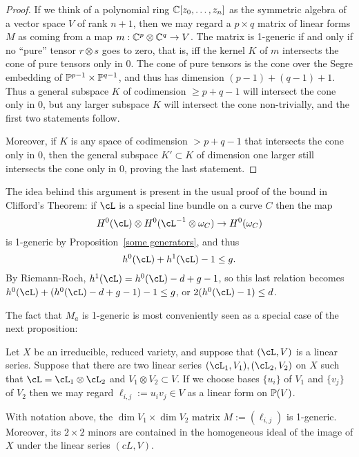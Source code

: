 \begin{proof}
If we think of a polynomial ring $\CC[z_0,\dots,z_n]$ as the symmetric algebra
of a vector space $V$ of rank $n+1$, then we may regard a $p\times q$ matrix of
linear forms $M$ as coming from a map $m: \CC^{p}\otimes \CC^{q}\to V$. The matrix is 1-generic
if and only if no ``pure'' tensor $r\otimes s$ goes to zero, that is, iff the kernel $K$ of $m$ intersects the cone of
pure tensors only in 0. The cone of pure tensors is the cone over the Segre embedding of $\PP^{p-1}\times \PP^{q-1}$, 
and thus has dimension $(p-1)+(q-1)+1$. Thus a general subspace $K$ of codimension $\geq p+q-1$ will intersect the cone
only in 0, but any larger subspace $K$ will intersect the cone non-trivially,  and the first two statements follow.

Moreover, if $K$ is any space of codimension $>p+q-1$ that intersects the cone only in 0, then the general subspace $K'\subset K$
of dimension one larger still intersects the cone only in 0, proving the last statement.
\end{proof}

The idea behind this argument is present in the usual proof of the bound in Clifford's Theorem: if $\cL$ is a special
line bundle on a curve $C$ then the map 
$$
\HH^0(\cL) \otimes \HH^0(\cL^{-1}\otimes \omega_C) \to \HH^0 (\omega_C)
$$
is 1-generic by Proposition~\ref{some generators}, and thus
$$
h^0(\cL)+h^1(\cL)-1 \leq g.
$$
By Riemann-Roch,  $h^1(\cL) = h^0(\cL) -d+g-1$, so this last relation becomes
$h^0(\cL)+(h^0(\cL) -d+g-1) -1 \leq g$, or $2(h^0(\cL)-1) \leq d$.


The fact that $M_{a}$ is 1-generic is most conveniently seen as a special case of the next proposition:

Let $X$ be
an irreducible, reduced variety, and suppose that $(\cL, V)$ is a linear series. Suppose that there are two linear series $(\cL_1,V_1),  (\cL_2,V_2)$ on $X$
such that $\cL = \cL_1\otimes\cL_2$ and $V_1\otimes V_2 \subset V$. If we
choose
bases $\{u_i\}$ of $V_1$ and $\{v_j\}$ of $V_2$ then we may regard $\ell_{i,j}:=u_iv_j\in V$
as a linear form on $\PP(V)$.

\begin{proposition}\label{some generators}
 With notation above, the $\dim V_1 \times \dim V_2$ matrix 
$M :=  (\ell_{i,j})$ is 1-generic. Moreover, its $2\times 2$ minors are contained in the homogeneous ideal of
the image of $X$ under the linear series $(cL, V)$.
\end{proposition}

